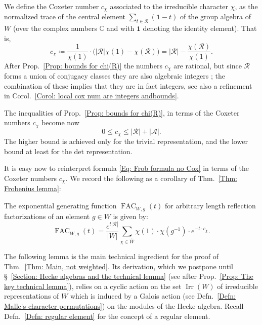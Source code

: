 \documentclass[ALCO, Unicode]{cedram}
\newcommand{\op}[1]{\operatorname{#1}}
\newcommand{\op}[1]{\operatorname{#1}}
\begin{document}
\begin{defi}\label{Defn: Coxeter numbers}
We define the Coxeter number $c_{\chi}$ associated to the irreducible character $\chi$, as the normalized trace of the central element $\sum_{t\in\mathcal{R}}(\mathbf{1}-t)$ of the group algebra of $W$ (over the complex numbers $\mathbb{C}$	 and with $\mathbf{1}$ denoting the identity element). That is, $$c_{\chi}\coloneqq \dfrac{1}{\chi(1)}\cdot\big(|\mathcal{R}|\chi(1)-\chi(\mathcal{R})\big)=|\mathcal{R}|-\dfrac{\chi(\mathcal{R})}{\chi(1)}.$$ After Prop.~\ref{Prop: bounds for chi(R)} the numbers $c_{\chi}$ are rational, but since $\mathcal{R}$ forms a union of conjugacy classes they are also algebraic integers \cite[Corol.~1, p.~52]{Serre}; the combination of these implies that they are in fact integers, see also a refinement in Corol.~\ref{Corol: local cox num are integers andbounds}.
\end{defi}


\begin{rema}\label{Rem: bounds Coxeter nums}
The inequalities of Prop.~\ref{Prop: bounds for chi(R)}, in terms of the Coxeter numbers $c_{\chi}$ become now
\[
0\leq c_{\chi}\leq |\mathcal{R}|+|\mathcal{A}|.
\]
The higher bound is achieved only for the trivial representation, and the lower bound at least for the det representation.
\end{rema}


It is easy now to reinterpret formula \eqref{Eq: Frob formula no Cox} in terms of the Coxeter numbers $c_{\chi}$. We record the following as a corollary of Thm.~\ref{Thm: Frobenius lemma}:

\begin{coro}
The exponential generating function $\op{FAC}_{W,g}(t)$ for arbitrary length reflection factorizations of an element $g\in W$ is given by:\begin{equation}
\op{FAC}_{W,g}(t)=\dfrac{e^{t|\mathcal{R}|}}{|W|}\sum_{\chi\in\widehat{W}}\chi(1)\cdot \chi(g^{-1})\cdot e^{-t\cdot c_{\chi}}.\label{EQ: Frobenius via Coxeter numbers}\end{equation}
\end{coro}

The following lemma is the main technical ingredient for the proof of Thm.~\ref{Thm: Main, not weighted}. Its derivation, which we postpone until \S~\ref{Section: Hecke algebras and the technical lemma} (see after Prop.~\ref{Prop: The key technical lemma}), relies on a cyclic action on the set $\op{Irr}(W)$ of irreducible representations of $W$ which is induced by a Galois action (see Defn.~\ref{Defn: Malle's character permutations}) on the modules of the Hecke algebra. Recall Defn.~\ref{Defn: regular element} for the concept of a regular element.
\end{document}
